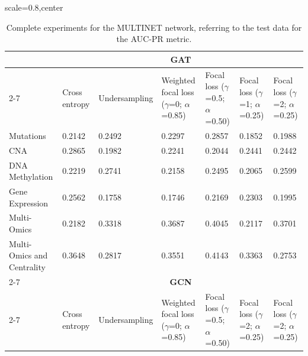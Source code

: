 \documentclass[ppgc, diss, english]{iiufrgs}
\begin{document}
\begin{landscape}

\begin{table}[!th]
\caption{Complete experiments for the MULTINET network, referring to the test data for the AUC-PR metric. \label{tab:completa_multinet}}
\centering
 \begin{adjustbox}{scale=0.8,center}

\begin{tabular}{lllllll}
\hline
                           & \multicolumn{6}{c}{\textbf{GAT}}                                                                                                                              \\ \cline{2-7} 
                           & Cross entropy & Undersampling & Weighted focal loss ($\gamma$=0; $\alpha$=0.85) & Focal loss ($\gamma$=0.5; $\alpha$=0.50) & Focal loss ($\gamma$=1; $\alpha$=0.25) & Focal loss ($\gamma$=2; $\alpha$=0.25) \\
Mutations                  & 0.2142        & 0.2492        & 0.2297                            & 0.2857                     & 0.1852                   & 0.1988                   \\
CNA                        & 0.2865        & 0.1982        & 0.2241                            & 0.2044                     & 0.2441                   & 0.2442                   \\
DNA Methylation            & 0.2219        & 0.2741        & 0.2158                            & 0.2495                     & 0.2065                   & 0.2599                   \\
Gene Expression            & 0.2562        & 0.1758        & 0.1746                            & 0.2169                     & 0.2303                   & 0.1995                   \\
Multi-Omics                & 0.2182        & 0.3318        & 0.3687                            & 0.4045                     & 0.2117                   & 0.3701                   \\
Multi-Omics and Centrality & 0.3648        & 0.2817        & 0.3551                            & 0.4143                     & 0.3363                   & 0.2753                   \\ \cline{2-7} 
                           & \multicolumn{6}{c}{\textbf{GCN}}                                                                                                                              \\ \cline{2-7} 
                           & Cross entropy & Undersampling & Weighted focal loss ($\gamma$=0; $\alpha$=0.85) & Focal loss ($\gamma$=0.5; $\alpha$=0.50) & Focal loss ($\gamma$=2; $\alpha$=0.25) & Focal loss ($\gamma$=2; $\alpha$=0.25) \\

\end{tabular}
\end{adjustbox}
\end{table}
\end{landscape}
\end{document}
